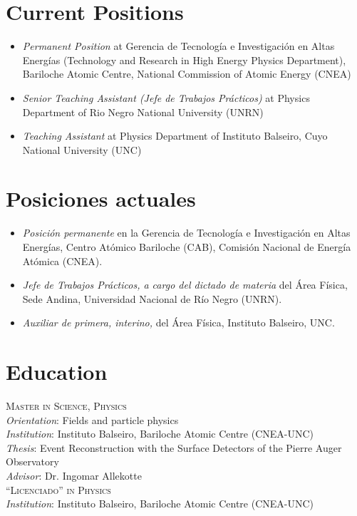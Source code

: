 \ifeng
\section*{Current Positions}
\begin{itemize}
\item \emph{Permanent Position} at Gerencia de Tecnología e Investigación en Altas Energías (Technology and Research in High Energy Physics Department), Bariloche Atomic Centre, National Commission of Atomic Energy (CNEA)
\item \emph{Senior Teaching Assistant (Jefe de Trabajos Prácticos)} at Physics Department of Rio Negro National University (UNRN)
\item \emph{Teaching Assistant} at Physics Department of Instituto Balseiro, Cuyo National University (UNC)
\end{itemize}
\else
\section*{Posiciones actuales}
\begin{itemize}
\item \emph{Posición permanente} en la Gerencia de Tecnología e Investigación en Altas Energías, Centro Atómico Bariloche (CAB), Comisión Nacional de Energía Atómica (CNEA).\\
\item \emph{Jefe de Trabajos Prácticos, a cargo del dictado de materia} del Área Física, Sede Andina, Universidad Nacional de Río Negro (UNRN).\\
\item \emph{Auxiliar de primera, interino,} del Área Física, Instituto Balseiro, UNC.\\
\end{itemize}
\fi

\ifeng
\section*{Education}
\noindent
\textsc{Master in Science, Physics}\\
{\emph{Orientation}}: Fields and particle physics\\
{\emph{Institution}}: Instituto Balseiro, Bariloche Atomic Centre (CNEA-UNC)\\
{\emph{Thesis}}: Event Reconstruction with the Surface Detectors of the Pierre
Auger Observatory\\
{\emph{Advisor}}: Dr. Ingomar Allekotte\\ 
\textsc{``Licenciado'' in Physics}\\
{\emph{Institution}}: Instituto Balseiro, Bariloche Atomic Centre (CNEA-UNC)\\
\else
